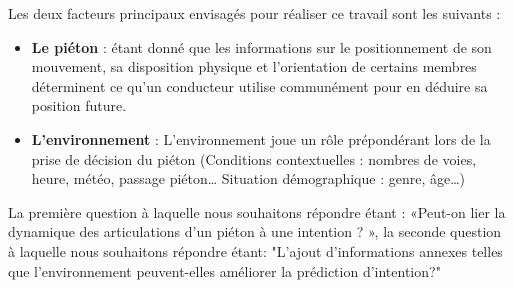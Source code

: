 Les deux facteurs principaux envisagés pour réaliser ce travail sont les suivants :

\begin{itemize}
    \item  \textbf{Le piéton} : étant donné que les informations sur le positionnement de son mouvement, sa disposition physique et l'orientation de certains membres déterminent ce qu'un conducteur utilise communément pour en déduire sa position future.
    \item \textbf{L’environnement} : L’environnement joue un rôle prépondérant lors de la prise de décision du piéton (Conditions contextuelles : nombres de voies, heure, météo, passage piéton… Situation démographique : genre, âge…)
\end{itemize}

La première question à laquelle nous souhaitons répondre étant : «Peut-on lier la dynamique des articulations d'un piéton à une intention ? », la seconde question à laquelle nous souhaitons répondre étant: "L'ajout d'informations annexes telles que l'environnement peuvent-elles améliorer la prédiction d'intention?"













